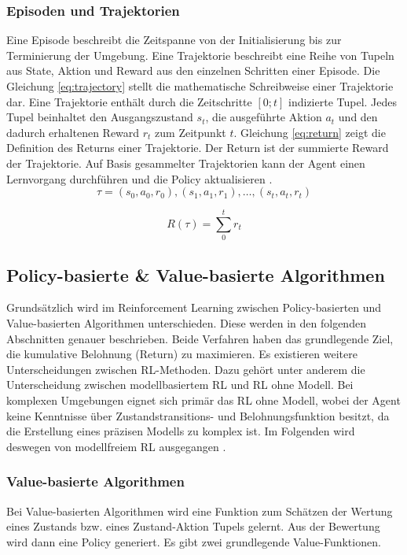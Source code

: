\subsubsection{Episoden und Trajektorien}
Eine Episode beschreibt die Zeitspanne von der Initialisierung bis zur Terminierung der Umgebung. Eine Trajektorie beschreibt eine Reihe von Tupeln aus State, Aktion und Reward aus den einzelnen Schritten einer Episode. Die Gleichung \ref{eq:trajectory} stellt die mathematische Schreibweise einer Trajektorie dar. Eine Trajektorie enthält durch die Zeitschritte $[0;t]$ indizierte Tupel. Jedes Tupel beinhaltet den Ausgangszustand $s_t$, die ausgeführte Aktion $a_t$ und den dadurch erhaltenen Reward $r_t$ zum Zeitpunkt $t$. Gleichung \ref{eq:return} zeigt die Definition des Returns einer Trajektorie. Der Return ist der summierte Reward der Trajektorie. Auf Basis gesammelter Trajektorien kann der Agent einen Lernvorgang durchführen und die Policy aktualisieren \cite{FoundationsDeepRL}.
\begin{equation}
    \tau = (s_0,a_0,r_0), (s_1,a_1,r_1), \dots, (s_t,a_t,r_t)
    \label{eq:trajectory}
\end{equation}

\begin{equation}
    R(\tau)=\sum_{0}^{t} r_t
    \label{eq:return}
\end{equation}
\subsection{Policy-basierte \& Value-basierte Algorithmen}
Grundsätzlich wird im Reinforcement Learning zwischen Policy-basierten und Value-basierten Algorithmen unterschieden. Diese werden in den folgenden Abschnitten genauer beschrieben. Beide Verfahren haben das grundlegende Ziel, die kumulative Belohnung (Return) zu maximieren.
Es existieren weitere Unterscheidungen zwischen RL-Methoden. Dazu gehört unter anderem die Unterscheidung zwischen modellbasiertem RL und RL ohne Modell. Bei komplexen Umgebungen eignet sich primär das RL ohne Modell, wobei der Agent keine Kenntnisse über Zustandstransitions- und Belohnungsfunktion besitzt, da die Erstellung eines präzisen Modells zu komplex ist. Im Folgenden wird deswegen von modellfreiem RL ausgegangen \cite{deepRL-2020}.

\subsubsection{Value-basierte Algorithmen}\label{sec:value}
Bei Value-basierten Algorithmen wird eine Funktion zum Schätzen der Wertung eines Zustands bzw. eines Zustand-Aktion Tupels gelernt. Aus der Bewertung wird dann eine Policy generiert. Es gibt zwei grundlegende Value-Funktionen.


